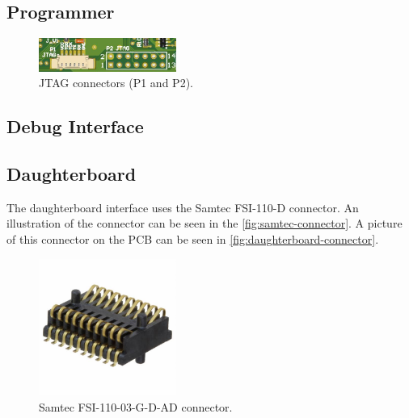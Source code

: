 \subsection{Programmer}

\begin{figure}[!ht]
    \begin{center}
        \includegraphics[width=0.4\textwidth]{figures/jtag-connector.png}
        \caption{JTAG connectors (P1 and P2).}
        \label{fig:jtag-connectors}
    \end{center}
\end{figure}

\subsection{Debug Interface}



\subsection{Daughterboard}

The daughterboard interface uses the Samtec FSI-110-D connector. An illustration of the connector can be seen in the \autoref{fig:samtec-connector}. A picture of this connector on the PCB can be seen in \autoref{fig:daughterboard-connector}.

\begin{figure}[!ht]
    \begin{center}
        \includegraphics[width=0.4\textwidth]{figures/samtec_fsi-110-03-g-d-ad.jpeg}
        \caption{Samtec FSI-110-03-G-D-AD connector.}
        \label{fig:samtec-connector}
    \end{center}
\end{figure}

